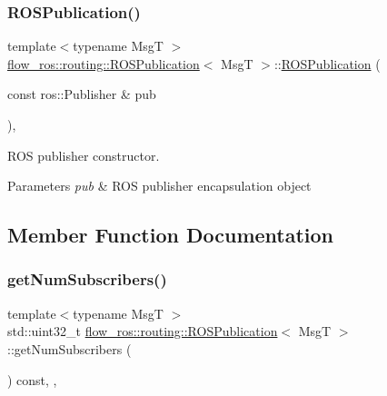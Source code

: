 \subsubsection{\texorpdfstring{R\+O\+S\+Publication()}{ROSPublication()}}
{\footnotesize\ttfamily template$<$typename MsgT $>$ \\
\hyperlink{classflow__ros_1_1routing_1_1_r_o_s_publication}{flow\+\_\+ros\+::routing\+::\+R\+O\+S\+Publication}$<$ MsgT $>$\+::\hyperlink{classflow__ros_1_1routing_1_1_r_o_s_publication}{R\+O\+S\+Publication} (\begin{DoxyParamCaption}\item[{const ros\+::\+Publisher \&}]{pub }\end{DoxyParamCaption})\hspace{0.3cm}{\ttfamily [inline]}, {\ttfamily [explicit]}}



R\+OS publisher constructor. 


\begin{DoxyParams}{Parameters}
{\em pub} & R\+OS publisher encapsulation object \\
\hline
\end{DoxyParams}


\subsection{Member Function Documentation}
\mbox{\label{classflow__ros_1_1routing_1_1_r_o_s_publication_a2f7dac08ffdaab4942dde41f6e5b39ba}} 
\subsubsection{\texorpdfstring{get\+Num\+Subscribers()}{getNumSubscribers()}}
{\footnotesize\ttfamily template$<$typename MsgT $>$ \\
std\+::uint32\+\_\+t \hyperlink{classflow__ros_1_1routing_1_1_r_o_s_publication}{flow\+\_\+ros\+::routing\+::\+R\+O\+S\+Publication}$<$ MsgT $>$\+::get\+Num\+Subscribers (\begin{DoxyParamCaption}{ }\end{DoxyParamCaption}) const\hspace{0.3cm}{\ttfamily [inline]}, {\ttfamily [override]}, {\ttfamily [virtual]}}



